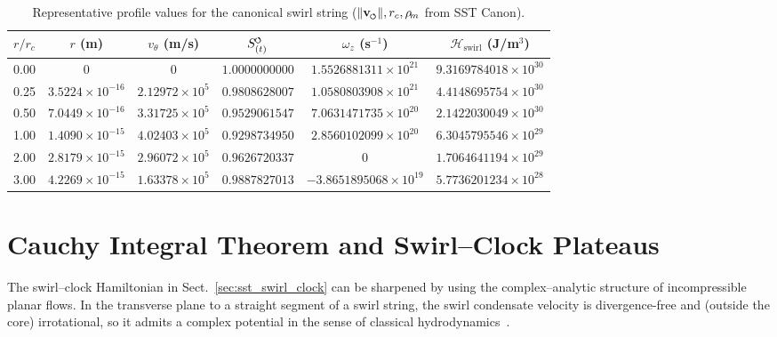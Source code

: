 \documentclass[11pt]{article}
\newcommand{\swirlarrow}{\mkern-2mu\scriptscriptstyle\boldsymbol{\circlearrowleft}}
\newcommand{\SwirlClock}{S_{(t)}^{\swirlarrow}}
\newcommand{\vnorm}{\lVert \mathbf{v}_{\mkern-2mu\scriptscriptstyle\boldsymbol{\circlearrowleft}} \rVert}               %
\newcommand{\rhoM}{\rho_{\!m}}   %
\newcommand{\rc}{r_c}                                    %
\begin{document}
    \begin{table}[h!]
        \centering
        \caption{Representative profile values for the canonical swirl string (\(\vnorm, \rc, \rhoM\) from SST Canon).}
        \label{tab:sst_swirl_profile}
        \small
        \begin{tabular}{@{}cccccc@{}}
            \toprule
            \(r/\rc\) & \(r\) (m) & \(v_\theta\) (m/s) & \(\SwirlClock\) & \(\omega_z\) (s\(^{-1}\)) & \(\mathcal{H}_{\text{swirl}}\) (J/m\(^3\)) \\
            \midrule
            0.00 & \(0\) & \(0\) & \(1.0000000000\) & \(1.5526881311\times10^{21}\) & \(9.3169784018\times10^{30}\) \\
            0.25 & \(3.5224\times10^{-16}\) & \(2.12972\times10^{5}\) & \(0.9808628007\) & \(1.0580803908\times10^{21}\) & \(4.4148695754\times10^{30}\) \\
            0.50 & \(7.0449\times10^{-16}\) & \(3.31725\times10^{5}\) & \(0.9529061547\) & \(7.0631471735\times10^{20}\) & \(2.1422030049\times10^{30}\) \\
            1.00 & \(1.4090\times10^{-15}\) & \(4.02403\times10^{5}\) & \(0.9298734950\) & \(2.8560102099\times10^{20}\) & \(6.3045795546\times10^{29}\) \\
            2.00 & \(2.8179\times10^{-15}\) & \(2.96072\times10^{5}\) & \(0.9626720337\) & \(0\) & \(1.7064641194\times10^{29}\) \\
            3.00 & \(4.2269\times10^{-15}\) & \(1.63378\times10^{5}\) & \(0.9887827013\) & \(-3.8651895068\times10^{19}\) & \(5.7736201234\times10^{28}\) \\
            \bottomrule
        \end{tabular}
    \end{table}

    \section{Cauchy Integral Theorem and Swirl--Clock Plateaus}
    \label{sec:sst_cauchy_swirl_clock}

    The swirl--clock Hamiltonian in Sect.~\ref{sec:sst_swirl_clock} can be sharpened by using the complex--analytic structure of incompressible planar flows. In the transverse plane to a straight segment of a swirl string, the swirl condensate velocity is divergence-free and (outside the core) irrotational, so it admits a complex potential in the sense of classical hydrodynamics~\cite{ahlforsComplexAnalysis1979,LambHydro,Batchelor1967,Saffman1992}.
\end{document}
